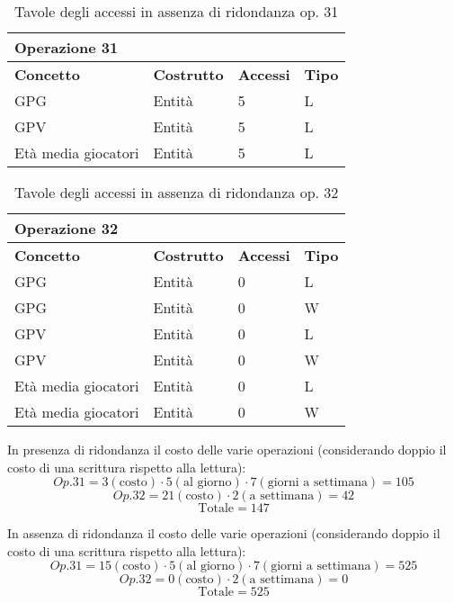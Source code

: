 \documentclass{article}
\begin{document}
\begin{table}
    \centering
    \begin{tabularx}{\textwidth}{|X|X|X|X|}
        \hline 
        \textbf{Operazione 31} & & & \\ \hline
        \textbf{Concetto} & \textbf{Costrutto} & \textbf{Accessi} & \textbf{Tipo} \\ \hline
        GPG & Entità & 5 & L \\ \hline
        GPV & Entità & 5 & L \\ \hline
        Età media giocatori & Entità & 5 & L \\ \hline
    \end{tabularx}
    \caption{Tavole degli accessi in assenza di ridondanza op. 31}
\end{table}

\begin{table}
    \centering
    \begin{tabularx}{\textwidth}{|X|X|X|X|}
        \hline
        \textbf{Operazione 32} & & & \\ \hline
        \textbf{Concetto} & \textbf{Costrutto} & \textbf{Accessi} & \textbf{Tipo} \\ \hline
        GPG & Entità & 0 & L \\ \hline
        GPG & Entità & 0 & W \\ \hline
        GPV & Entità & 0 & L \\ \hline
        GPV & Entità & 0 & W \\ \hline
        Età media giocatori & Entità & 0 & L \\ \hline
        Età media giocatori & Entità & 0 & W \\ \hline
    \end{tabularx}
    \caption{Tavole degli accessi in assenza di ridondanza op. 32}
\end{table}

In presenza di ridondanza il costo delle varie operazioni (considerando doppio il costo di una scrittura rispetto alla lettura):
$$ Op.31 = 3 (\text{costo}) \cdot 5 (\text{al giorno}) \cdot 7 (\text{giorni a settimana}) = 105 $$
$$ Op.32 = 21 (\text{costo}) \cdot 2 (\text{a settimana}) = 42 $$
$$\text{Totale} = 147$$

In assenza di ridondanza il costo delle varie operazioni (considerando doppio il costo di una scrittura rispetto alla lettura):
$$ Op.31 = 15 (\text{costo}) \cdot 5 (\text{al giorno}) \cdot 7 (\text{giorni a settimana}) = 525 $$
$$ Op.32 = 0 (\text{costo}) \cdot 2 (\text{a settimana}) = 0 $$
$$\text{Totale} = 525$$
\end{document}
